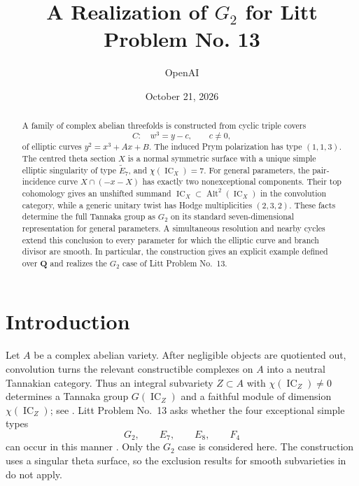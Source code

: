 \documentclass[10pt]{amsart}
\title[A realization of $G_2$ for Litt Problem No. 13]
      {A Realization of $G_2$ for Litt Problem No. 13}
\author{OpenAI}
\date{October 21, 2026}
\numberwithin{equation}{section}
\theoremstyle{definition}
\theoremstyle{remark}
\newcommand{\QQ}{\mathbf Q}
\newcommand{\IC}{\operatorname{IC}}
\newcommand{\Alt}{\operatorname{Alt}}
\newcommand{\wt}{\widetilde}
\begin{document}
\raggedbottom

\begin{abstract}
A family of complex abelian threefolds is constructed from cyclic triple covers
\[
  C:\quad w^3=y-c,\qquad c\ne0,
\]
of elliptic curves $y^2=x^3+Ax+B$.  The induced Prym polarization has type
$(1,1,3)$.  The centred theta section $X$ is a normal symmetric surface with
a unique simple elliptic singularity of type $\wt E_7$, and
$\chi(\IC_X)=7$.  For general parameters, the pair-incidence curve
$X\cap(-x-X)$ has exactly two nonexceptional components.  Their top
cohomology gives an unshifted summand $\IC_X\subset\Alt^2(\IC_X)$ in the
convolution category, while a generic unitary twist has Hodge multiplicities
$(2,3,2)$.  These facts determine the full Tannaka group as $G_2$ on its
standard seven-dimensional representation for general parameters.
A simultaneous resolution and nearby cycles extend this conclusion to
every parameter for which the elliptic curve and branch divisor are smooth.
In particular, the construction gives an explicit example defined over
$\QQ$ and realizes the $G_2$ case of Litt Problem No.~13.
\end{abstract}

\maketitle

\section{Introduction}

Let $A$ be a complex abelian variety.  After negligible objects are
quotiented out, convolution turns the relevant constructible complexes on
$A$ into a neutral Tannakian category.  Thus an integral subvariety
$Z\subset A$ with $\chi(\IC_Z)\ne0$ determines a Tannaka group
$G(\IC_Z)$ and a faithful module of dimension $\chi(\IC_Z)$; see
\cite[Proposition~3.1 and Definition~3.2]{JKLM2025}.  Litt Problem No.~13 asks whether the four
exceptional simple types
\[
  G_2,\qquad E_7,\qquad E_8,\qquad F_4
\]
can occur in this manner \cite{Litt13}.  Only the $G_2$ case is considered
here.  The construction
uses a singular theta surface, so the exclusion results for smooth
subvarieties in \cite{KLM2026} do not apply.
\end{document}
